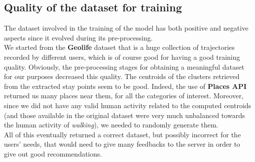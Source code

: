 \documentclass[../../main]{subfiles}
\begin{document}
\subsection{Quality of the dataset for training}
\label{ss:quality-training-dataset}

The dataset involved in the training of the model has both positive and negative aspects since it evolved during its pre-processing.\\
We started from the \textbf{Geolife} dataset that is a huge collection of trajectories recorded by different users, which is of course good for having a good training quality.
Obviously, the pre-processing stages for obtaining a meaningful dataset for our purposes decreased this quality.
The centroids of the clusters retrieved from the extracted stay points seem to be good.
Indeed, the use of \textbf{Places API} returned us many places near them, for all the categories of interest.
Moreover, since we did not have any valid human activity related to the computed centroids (and those available in the original dataset were very much unbalanced towards the human activity of \textit{walking}), we needed to randomly generate them.\\
All of this eventually returned a correct dataset, but possibly incorrect for the users' needs, that would need to give many feedbacks to the server in order to give out good recommendations.
\end{document}

